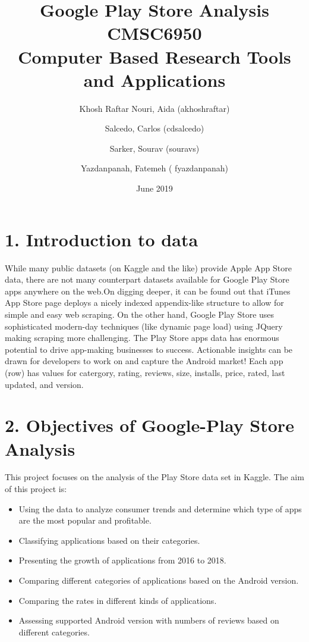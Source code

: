 \documentclass{article}
\title{
Google Play Store Analysis\\
CMSC6950 \\
Computer Based Research Tools and Applications
}
\author{Khosh Raftar Nouri, Aida  (akhoshraftar)\and
Salcedo, Carlos (cdsalcedo) \and
Sarker, Sourav (souravs)\and
Yazdanpanah, Fatemeh ( fyazdanpanah)} \date{June 2019}
\begin{document}
\maketitle

\section*{1. Introduction to data}

While many public datasets (on Kaggle and the like) provide Apple App Store data, there are not many counterpart datasets available for Google Play Store apps anywhere on the web.On digging deeper, it can be found out that iTunes App Store page deploys a nicely indexed appendix-like structure to allow for simple and easy web scraping. On the other hand, Google Play Store uses sophisticated modern-day techniques (like dynamic page load) using JQuery making scraping more challenging.
The Play Store apps data has enormous potential to drive app-making businesses to success. Actionable insights can be drawn for developers to work on and capture the Android market!
Each app (row) has values for catergory, rating, reviews, size, installs, price, rated, last updated, and version.


\section*{2. Objectives of Google-Play Store Analysis}
This project focuses on the analysis of the Play Store data set in Kaggle.
The aim of this project is:
\begin{itemize}
\item Using the data to analyze consumer trends and determine which type of apps are the most popular and profitable.\\
\item Classifying applications based on their categories.\\
\item Presenting the growth of applications from 2016 to 2018.\\
\item Comparing different categories of applications based on the Android version.\\
\item Comparing the rates in different kinds of applications.\\
\item Assessing supported Android version with numbers of reviews based on different categories.\\
\end{itemize}
\end{document}
